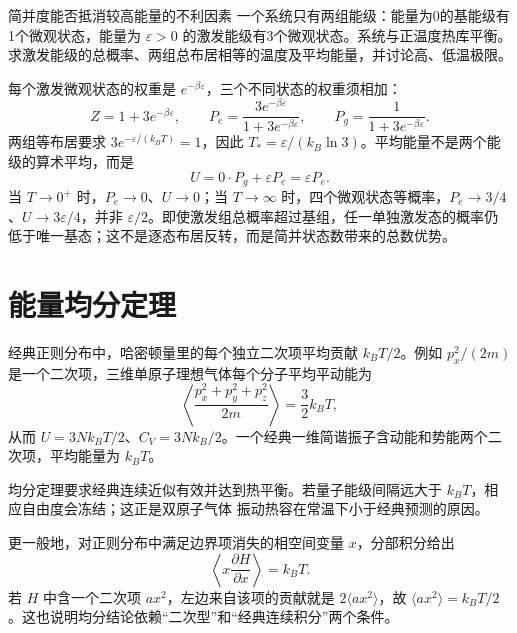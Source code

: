 \Needspace{180pt}
\begin{origexamplebox}{简并度能否抵消较高能量的不利因素}\label{ch18:ex:teaching-degeneracy}
一个系统只有两组能级：能量为0的基能级有1个微观状态，能量为 $\varepsilon>0$ 的激发能级有3个微观状态。系统与正温度热库平衡。求激发能级的总概率、两组总布居相等的温度及平均能量，并讨论高、低温极限。

\StatQDegeneracy
\end{origexamplebox}
\Needspace{65pt}
\begin{xesolution}
每个激发微观状态的权重是 $e^{-\beta\varepsilon}$，三个不同状态的权重须相加：
\[
 Z=1+3e^{-\beta\varepsilon},\qquad
 P_e=\frac{3e^{-\beta\varepsilon}}{1+3e^{-\beta\varepsilon}},\qquad
 P_g=\frac1{1+3e^{-\beta\varepsilon}}.
\]
两组等布居要求 $3e^{-\varepsilon/(k_BT)}=1$，因此 $T_*=\varepsilon/(k_B\ln3)$。平均能量不是两个能级的算术平均，而是
\[
 U=0\cdot P_g+\varepsilon P_e=\varepsilon P_e.
\]
当 $T\to0^+$ 时，$P_e\to0$、$U\to0$；当 $T\to\infty$ 时，四个微观状态等概率，$P_e\to3/4$、$U\to3\varepsilon/4$，并非 $\varepsilon/2$。即使激发组总概率超过基组，任一单独激发态的概率仍低于唯一基态；这不是逐态布居反转，而是简并状态数带来的总数优势。

\StatADegeneracy
\end{xesolution}

\section{能量均分定理}

经典正则分布中，哈密顿量里的每个独立二次项平均贡献 $k_BT/2$。例如
$p_x^2/(2m)$ 是一个二次项，三维单原子理想气体每个分子平均平动能为
\begin{equation}
 \left\langle\frac{p_x^2+p_y^2+p_z^2}{2m}\right\rangle=\frac32k_BT,
\end{equation}
从而 $U=3Nk_BT/2$、$C_V=3Nk_B/2$。一个经典一维简谐振子含动能和势能两个二次项，平均能量为 $k_BT$。

均分定理要求经典连续近似有效并达到热平衡。若量子能级间隔远大于 $k_BT$，相应自由度会冻结；这正是双原子气体
振动热容在常温下小于经典预测的原因。

更一般地，对正则分布中满足边界项消失的相空间变量 $x$，分部积分给出
\begin{equation}
 \left\langle x\frac{\partial H}{\partial x}\right\rangle=k_BT.
\end{equation}
若 $H$ 中含一个二次项 $ax^2$，左边来自该项的贡献就是 $2\langle ax^2\rangle$，故
$\langle ax^2\rangle=k_BT/2$。这也说明均分结论依赖“二次型”和“经典连续积分”两个条件。

